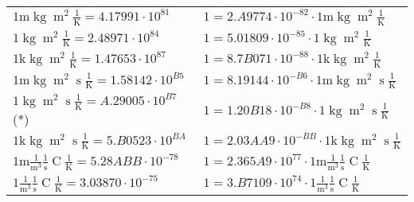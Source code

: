 \begin{center}
\begin{longtable}{l l}
{\color{gray}$1 \bm{\mathrm{ m}}\operatorname{kg}{\operatorname{m}^2}{}{}\frac1{\operatorname{K}} = 4.17991\cdot10^{81} $}   & {\color{gray}$ 1 = 2.A9774\cdot10^{-82} \cdot 1 \bm{\mathrm{ m}}\operatorname{kg}{\operatorname{m}^2}{}{}\frac1{\operatorname{K}}$}  \\
{\color{black}$1 \bm{\mathrm{ }}\operatorname{kg}{\operatorname{m}^2}{}{}\frac1{\operatorname{K}} = 2.48971\cdot10^{84} $}   & {\color{black}$ 1 = 5.01809\cdot10^{-85} \cdot 1 \bm{\mathrm{ }}\operatorname{kg}{\operatorname{m}^2}{}{}\frac1{\operatorname{K}}$}  \\
{\color{gray}$1 \bm{\mathrm{ k}}\operatorname{kg}{\operatorname{m}^2}{}{}\frac1{\operatorname{K}} = 1.47653\cdot10^{87} $}   & {\color{gray}$ 1 = 8.7B071\cdot10^{-88} \cdot 1 \bm{\mathrm{ k}}\operatorname{kg}{\operatorname{m}^2}{}{}\frac1{\operatorname{K}}$}  \\
{\color{gray}$1 \bm{\mathrm{ m}}\operatorname{kg}{\operatorname{m}^2}{\operatorname{s}}{}\frac1{\operatorname{K}} = 1.58142\cdot10^{B5} $}   & {\color{gray}$ 1 = 8.19144\cdot10^{-B6} \cdot 1 \bm{\mathrm{ m}}\operatorname{kg}{\operatorname{m}^2}{\operatorname{s}}{}\frac1{\operatorname{K}}$}  \\
{\color{black}$1 \bm{\mathrm{ }}\operatorname{kg}{\operatorname{m}^2}{\operatorname{s}}{}\frac1{\operatorname{K}} = A.29005\cdot10^{B7} $}\quad(*) & {\color{black}$ 1 = 1.20B18\cdot10^{-B8} \cdot 1 \bm{\mathrm{ }}\operatorname{kg}{\operatorname{m}^2}{\operatorname{s}}{}\frac1{\operatorname{K}}$}  \\
{\color{gray}$1 \bm{\mathrm{ k}}\operatorname{kg}{\operatorname{m}^2}{\operatorname{s}}{}\frac1{\operatorname{K}} = 5.B0523\cdot10^{BA} $}   & {\color{gray}$ 1 = 2.03AA9\cdot10^{-BB} \cdot 1 \bm{\mathrm{ k}}\operatorname{kg}{\operatorname{m}^2}{\operatorname{s}}{}\frac1{\operatorname{K}}$}  \\
\hline{\color{gray}$1 \bm{\mathrm{ m}}\frac1{\operatorname{m}^3}\frac1{\operatorname{s}}{\operatorname{C}}\frac1{\operatorname{K}} = 5.28ABB\cdot10^{-78} $}   & {\color{gray}$ 1 = 2.365A9\cdot10^{77} \cdot 1 \bm{\mathrm{ m}}\frac1{\operatorname{m}^3}\frac1{\operatorname{s}}{\operatorname{C}}\frac1{\operatorname{K}}$}  \\
{\color{black}$1 \bm{\mathrm{ }}\frac1{\operatorname{m}^3}\frac1{\operatorname{s}}{\operatorname{C}}\frac1{\operatorname{K}} = 3.03870\cdot10^{-75} $}   & {\color{black}$ 1 = 3.B7109\cdot10^{74} \cdot 1 \bm{\mathrm{ }}\frac1{\operatorname{m}^3}\frac1{\operatorname{s}}{\operatorname{C}}\frac1{\operatorname{K}}$}  \\

\end{longtable}
\end{center}
